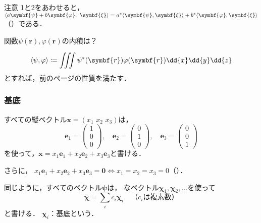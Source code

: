 \documentclass[
    10pt,
    ]{sotsu-beamer}
\begin{document}
\begin{frame}[allowframebreaks]
    \begin{alertblock}{注意}
        1と2をあわせると，
        $\iparen{a\symbf{\psi} + b\symbf{\varphi}, \  \symbf{\xi}} = \conj{a}\iparen{\symbf{\psi}, \symbf{\xi}} + \conj{b}\iparen{\symbf{\varphi}, \symbf{\xi}}$（）である．
    \end{alertblock}


    \framebreak


    関数$\psi(\symbf{r}), \varphi(\symbf{r})$の内積は？

    \pause

    \begin{equation}
        \iparen{\psi, \varphi}
            \coloneq \iiint \conj{\psi}(\symbf{r}) \varphi(\symbf{r}) \dd{x} \dd{y} \dd{z}
    \end{equation}
    とすれば，前のページの性質を満たす．

\end{frame}


\begin{frame}
    \frametitle{基底}

    すべての縦ベクトル$\symbf{x} = (x_1 \,\, x_2 \,\, x_3)$は，
    \begin{equation}
        \label{eq:Euclidean-basis}
        \symbf{e}_1 = \begin{pmatrix} 1 \\ 0 \\ 0 \end{pmatrix}, \quad 
        \symbf{e}_2 = \begin{pmatrix} 0 \\ 1 \\ 0 \end{pmatrix}, \quad 
        \symbf{e}_3 = \begin{pmatrix} 0 \\ 0 \\ 1 \end{pmatrix}
    \end{equation}
    を使って，$\symbf{x} = x_1 \symbf{e}_1 + x_2 \symbf{e}_2 + x_3 \symbf{e}_3$と書ける．

    さらに，
    \begin{math}
        x_1 \symbf{e}_1 + x_2 \symbf{e}_2 + x_3 \symbf{e}_3 = \symbf{0}
        \iff
        x_1 = x_2 = x_3 = 0
    \end{math}（）．

    \pause

    同じように，\alert{すべてのベクトル}$\symbf{\psi}$は，
    なベクトル$\symbf{\chi}_1, \symbf{\chi}_2, \dotsc$を使って
    \begin{equation}
        \label{eq:basis}
        \symbf{\chi} = \sum_i c_i \symbf{\chi}_i
        \quad \text{（$c_i$は複素数）}
    \end{equation}
    と書ける．
    \pause
    $\symbf{\chi}_i$：\alert{基底}という．

\end{frame}
\end{document}
